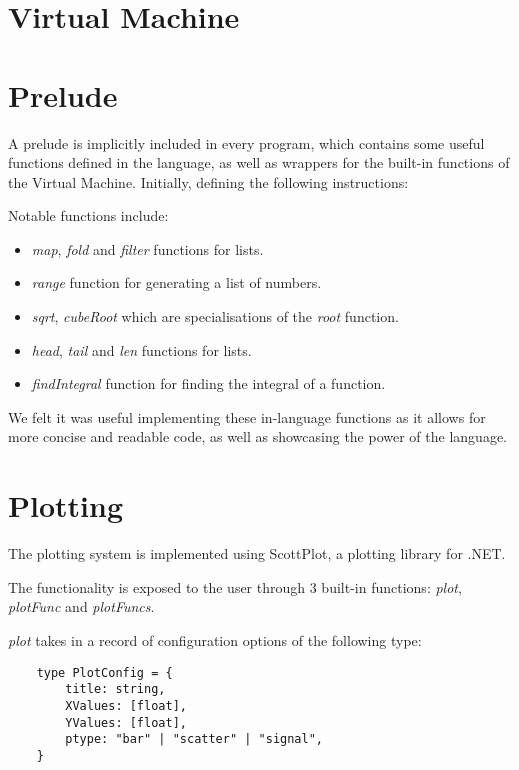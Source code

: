\section{Virtual Machine}\label{sec:virtual-machine}

\section{Prelude}\label{sec:prelude}

A prelude is implicitly included in every program, which contains some useful functions defined in the language, as 
well as wrappers for the built-in functions of the Virtual Machine. Initially, defining the following instructions:

Notable functions include:

\begin{itemize}
    \item \textit{map}, \textit{fold} and \textit{filter} functions for lists.
    \item \textit{range} function for generating a list of numbers.
    \item \textit{sqrt}, \textit{cubeRoot} which are specialisations of the \textit{root} function.
    \item \textit{head}, \textit{tail} and \textit{len} functions for lists.
    \item \textit{findIntegral} function for finding the integral of a function.
\end{itemize}

We felt it was useful implementing these in-language functions as it allows for more concise and readable code, as
well as showcasing the power of the language.

\section{Plotting}\label{sec:plotting}

The plotting system is implemented using ScottPlot\citep{scottPlot}, a plotting library for .NET\@.

The functionality is exposed to the user through 3 built-in functions: \textit{plot}, \textit{plotFunc} and 
\textit{plotFuncs}.

\textit{plot} takes in a record of configuration options of the following type:

\begin{verbatim}
    type PlotConfig = {
        title: string,
        XValues: [float],
        YValues: [float],
        ptype: "bar" | "scatter" | "signal",
    }
\end{verbatim}

